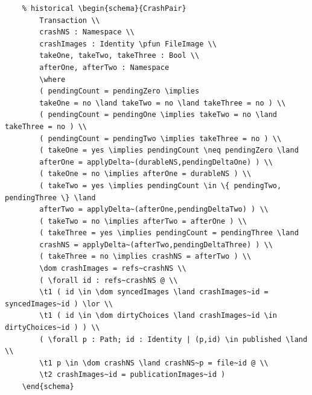 \documentclass{article}
\begin{document}
\begin{verbatim}
	% historical \begin{schema}{CrashPair}
		Transaction \\
		crashNS : Namespace \\
		crashImages : Identity \pfun FileImage \\
		takeOne, takeTwo, takeThree : Bool \\
		afterOne, afterTwo : Namespace
		\where
		( pendingCount = pendingZero \implies
		takeOne = no \land takeTwo = no \land takeThree = no ) \\
		( pendingCount = pendingOne \implies takeTwo = no \land takeThree = no ) \\
		( pendingCount = pendingTwo \implies takeThree = no ) \\
		( takeOne = yes \implies pendingCount \neq pendingZero \land
		afterOne = applyDelta~(durableNS,pendingDeltaOne) ) \\
		( takeOne = no \implies afterOne = durableNS ) \\
		( takeTwo = yes \implies pendingCount \in \{ pendingTwo, pendingThree \} \land
		afterTwo = applyDelta~(afterOne,pendingDeltaTwo) ) \\
		( takeTwo = no \implies afterTwo = afterOne ) \\
		( takeThree = yes \implies pendingCount = pendingThree \land
		crashNS = applyDelta~(afterTwo,pendingDeltaThree) ) \\
		( takeThree = no \implies crashNS = afterTwo ) \\
		\dom crashImages = refs~crashNS \\
		( \forall id : refs~crashNS @ \\
		\t1 ( id \in \dom syncedImages \land crashImages~id = syncedImages~id ) \lor \\
		\t1 ( id \in \dom dirtyChoices \land crashImages~id \in dirtyChoices~id ) ) \\
		( \forall p : Path; id : Identity | (p,id) \in published \land \\
		\t1 p \in \dom crashNS \land crashNS~p = file~id @ \\
		\t2 crashImages~id = publicationImages~id )
	\end{schema}


\end{verbatim}
\end{document}
